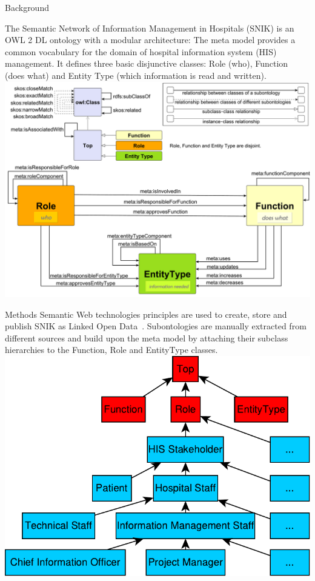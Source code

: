\documentclass[portrait,final,a0paper,fontscale=0.310]{imiseposter}
\begin{document}
\begin{poster}
\begin{posterbox}[name=background,column=0,row=0]{Background}

The Semantic Network of Information Management in Hospitals (SNIK) is an OWL 2 DL ontology with a modular architecture:
The meta model provides a common vocabulary for the domain of hospital information system (HIS) management.
It defines three basic disjunctive classes: Role (who), Function (does what) and Entity Type (which information is read and written). %
\includegraphics[width=1.01\columnwidth]{img/metamodel9s.pdf}
\vspace{0.3em}
\end{posterbox}
\begin{posterbox}[name=methods,below=background]{Methods}
Semantic Web technologies principles are used to create, store and publish SNIK as Linked Open Data~\cite{sniktec}.
Subontologies are manually extracted from different sources and build upon the meta model by attaching their subclass hierarchies to the Function, Role and EntityType classes.
{\centering\includegraphics[width=0.8\columnwidth]{img/hierarchy.pdf}}

\end{posterbox}
\end{poster}
\end{document}
